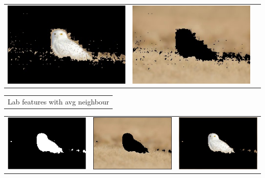 \documentclass{article}
\begin{document}
\begin{center}
\begin{tabular}{c c c}
 \includegraphics[width=.37\linewidth]{../image-segmentation/output/add-Lab-neighbor-diff-feature/owl_seg1.jpg} & \includegraphics[width=.37\linewidth]{../image-segmentation/output/add-Lab-neighbor-diff-feature/owl_seg2.jpg} \\
  
 \end{tabular}
 \begin{tabular}{c}

Lab features with avg neighbour \\
\end{tabular}
 \begin{tabular}{c c c} 

 \includegraphics[width=.37\linewidth]{../image-segmentation/output/add-Lab-neighbor-avg-feature/owl_mask.jpg} & 
 
 \includegraphics[width=.37\linewidth]{../image-segmentation/output/add-Lab-neighbor-avg-feature/owl_seg1.jpg} & \includegraphics[width=.37\linewidth]{../image-segmentation/output/add-Lab-neighbor-avg-feature/owl_seg2.jpg} \\
  
 \end{tabular}
 
 
\end{center}
\end{document}
